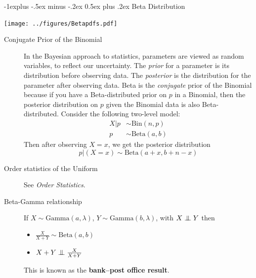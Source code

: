 \documentclass[10pt,landscape]{article}
\makeatletter
\newcommand\independent{\protect\mathpalette{\protect\independenT}{\perp}}
\def\independenT#1#2{\mathrel{\setbox0\hbox{$#1#2$}%
    \copy0\kern-\wd0\mkern4mu\box0}}
\newcommand{\Bin}{\textrm{Bin}}
\newcommand{\Beta}{\textrm{Beta}}
\newcommand{\Gam}{\textrm{Gamma}}
\renewcommand{\subsection}{\@startsection{subsection}{2}{0mm}%
                                {-1explus -.5ex minus -.2ex}%
                                {0.5ex plus .2ex}%
                                {\normalfont\normalsize\bfseries}}
\makeatother
\begin{document}
\begin{multicols*}{3}
\begin{description}
                                                              
    \end{description}
                                    
    \subsection{Beta Distribution}
    \begin{minipage}{\linewidth}
        \centering
        \texttt{[image: ../figures/Betapdfs.pdf]}
    \end{minipage}
    \medskip
                                    
    \begin{description}
        \item[Conjugate Prior of the Binomial] In the Bayesian approach to statistics, parameters are viewed as random variables, to reflect our uncertainty. The \emph{prior} for a parameter is its distribution before observing data. The \emph{posterior}  is the distribution for the parameter after observing data. Beta is the \emph{conjugate} prior of the Binomial because if you have a Beta-distributed prior on $p$ in a Binomial, then the posterior distribution on $p$ given the Binomial data is also Beta-distributed. Consider the following two-level model:
        \begin{align*}
            X|p & \sim \Bin(n, p)  \\
            p   & \sim \Beta(a, b) 
        \end{align*}
        Then after observing  $X = x$, we get the posterior distribution
        \[p|(X=x) \sim \Beta(a + x, b + n - x) \]
                                                
        \item[Order statistics of the Uniform] See \emph{Order Statistics}.
        \item[Beta-Gamma relationship] If $X \sim \Gam(a, \lambda)$, $Y \sim \Gam(b, \lambda)$, with $X \independent Y$ then
        \begin{itemize}
            \item $\frac{X}{X + Y} \sim \Beta(a, b)$
            \item $X + Y \independent \frac{X}{X + Y}$
        \end{itemize}
        This is known as the \textbf{bank--post office result}.
    \end{description}
                                    

\end{multicols*}
\end{document}
